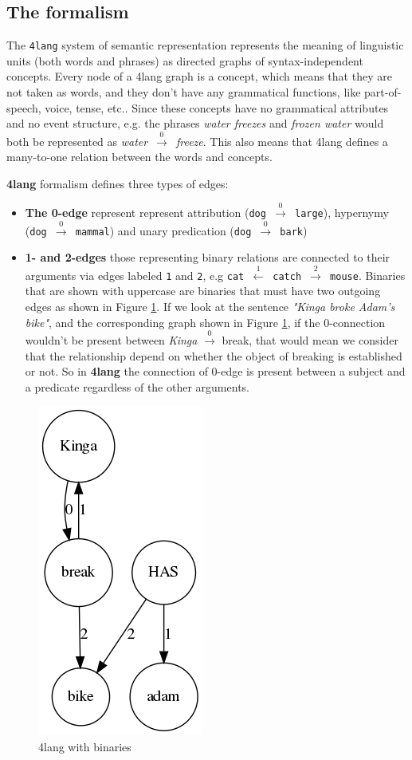 \subsection{The formalism}
The \texttt{4lang} system of semantic representation \cite{Kornai:2015a}
represents the meaning of linguistic units (both words and phrases)
as directed graphs of syntax-independent concepts. Every node of a 4lang graph is a concept, which means that they are not taken as words, and they don't have any grammatical functions, like part-of-speech, voice, tense, etc.\cite{Recski:2016}.
Since these concepts have no grammatical attributes and no event structure, e.g.
the phrases \textit{water freezes} and \textit{frozen water} would both be
represented as \textit{water}~$\xrightarrow0$~\textit{freeze}. This also means that 4lang defines a many-to-one relation between the words and concepts. 

\textbf{4lang} formalism defines three types of edges:
\begin{itemize}
	\item \textbf{The 0-edge} represent represent attribution (\texttt{dog
		$\xrightarrow0$ large}), hypernymy (\texttt{dog $\xrightarrow0$ mammal}) and unary predication (\texttt{dog  $\xrightarrow0$ bark})
	\item \textbf{1- and 2-edges} those representing binary relations are connected to their arguments
	via edges labeled \texttt{1} and \texttt{2}, e.g \texttt{cat $\xleftarrow1$ catch $\xrightarrow2$ mouse}. Binaries that are shown with uppercase are binaries that must have two outgoing edges as shown in Figure \ref{fig:4langbin}. If we look at the sentence \textit{"Kinga broke Adam's bike"}, and the corresponding graph shown in Figure \ref{fig:4langbin}, if the 0-connection wouldn't be present between \textit{Kinga} $\xrightarrow0$ break, that would mean we consider that the relationship depend on whether the object of breaking is established or not. So in \textbf{4lang} the connection of 0-edge is present between a subject and a predicate regardless of the other arguments.
\end{itemize}

\begin{figure}[h]
	\centering
	\includegraphics[height=0.5\textwidth]{figures/binary4lang}
	\caption{4lang with binaries}
	\label{fig:4langbin}
\end{figure}

